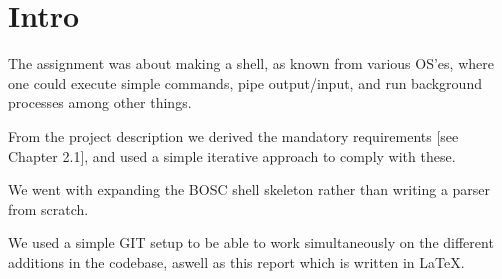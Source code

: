 \chapter{Intro}
The assignment was about making a shell, as known from various OS'es, where one could execute simple commands, pipe output/input, and run background processes among other things.

From the project description we derived the mandatory requirements [see Chapter 2.1], and used a simple iterative approach to comply with these.

We went with expanding the BOSC shell skeleton rather than writing a parser from scratch.

We used a simple GIT setup to be able to work simultaneously on the different additions in the codebase, aswell as this report which is written in LaTeX.

